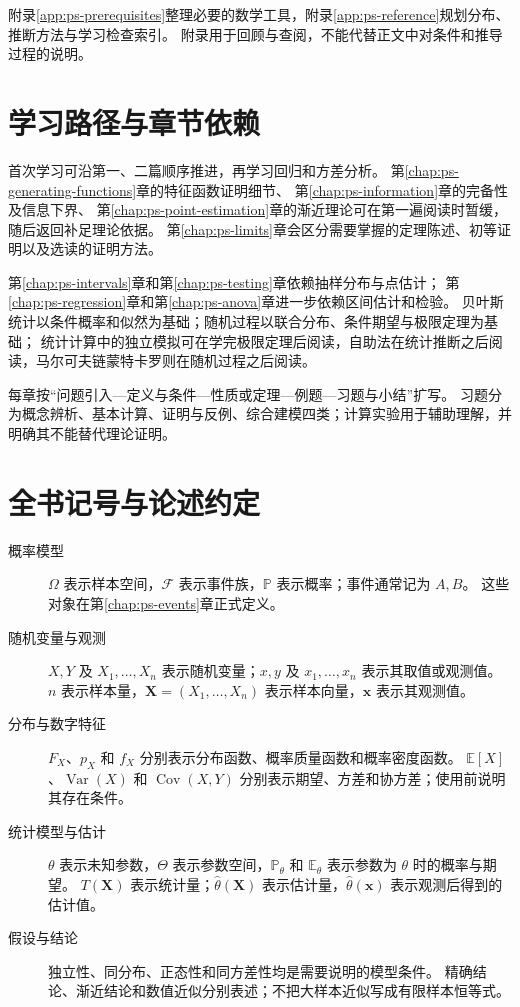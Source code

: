 \documentclass[UTF8,12pt,a4paper,fontset=fandol]{ctexbook}
\begin{document}
附录\ref{app:ps-prerequisites}整理必要的数学工具，附录\ref{app:ps-reference}规划分布、推断方法与学习检查索引。
附录用于回顾与查阅，不能代替正文中对条件和推导过程的说明。

\section*{学习路径与章节依赖}

首次学习可沿第一、二篇顺序推进，再学习回归和方差分析。
第\ref{chap:ps-generating-functions}章的特征函数证明细节、
第\ref{chap:ps-information}章的完备性及信息下界、
第\ref{chap:ps-point-estimation}章的渐近理论可在第一遍阅读时暂缓，随后返回补足理论依据。
第\ref{chap:ps-limits}章会区分需要掌握的定理陈述、初等证明以及选读的证明方法。

第\ref{chap:ps-intervals}章和第\ref{chap:ps-testing}章依赖抽样分布与点估计；
第\ref{chap:ps-regression}章和第\ref{chap:ps-anova}章进一步依赖区间估计和检验。
贝叶斯统计以条件概率和似然为基础；随机过程以联合分布、条件期望与极限定理为基础；
统计计算中的独立模拟可在学完极限定理后阅读，自助法在统计推断之后阅读，马尔可夫链蒙特卡罗则在随机过程之后阅读。

每章按“问题引入---定义与条件---性质或定理---例题---习题与小结”扩写。
习题分为概念辨析、基本计算、证明与反例、综合建模四类；计算实验用于辅助理解，并明确其不能替代理论证明。

\section*{全书记号与论述约定}

\begin{description}
  \item[概率模型]
  $\Omega$ 表示样本空间，$\mathcal F$ 表示事件族，$\mathbb P$ 表示概率；事件通常记为 $A,B$。
  这些对象在第\ref{chap:ps-events}章正式定义。
  \item[随机变量与观测]
  $X,Y$ 及 $X_1,\ldots,X_n$ 表示随机变量；$x,y$ 及 $x_1,\ldots,x_n$ 表示其取值或观测值。
  $n$ 表示样本量，$\mathbf X=(X_1,\ldots,X_n)$ 表示样本向量，$\mathbf x$ 表示其观测值。
  \item[分布与数字特征]
  $F_X$、$p_X$ 和 $f_X$ 分别表示分布函数、概率质量函数和概率密度函数。
  $\mathbb E[X]$、$\operatorname{Var}(X)$ 和 $\operatorname{Cov}(X,Y)$ 分别表示期望、方差和协方差；使用前说明其存在条件。
  \item[统计模型与估计]
  $\theta$ 表示未知参数，$\Theta$ 表示参数空间，$\mathbb P_\theta$ 和 $\mathbb E_\theta$ 表示参数为 $\theta$ 时的概率与期望。
  $T(\mathbf X)$ 表示统计量；$\widehat\theta(\mathbf X)$ 表示估计量，$\widehat\theta(\mathbf x)$ 表示观测后得到的估计值。
  \item[假设与结论]
  独立性、同分布、正态性和同方差性均是需要说明的模型条件。
  精确结论、渐近结论和数值近似分别表述；不把大样本近似写成有限样本恒等式。
\end{description}
\end{document}
